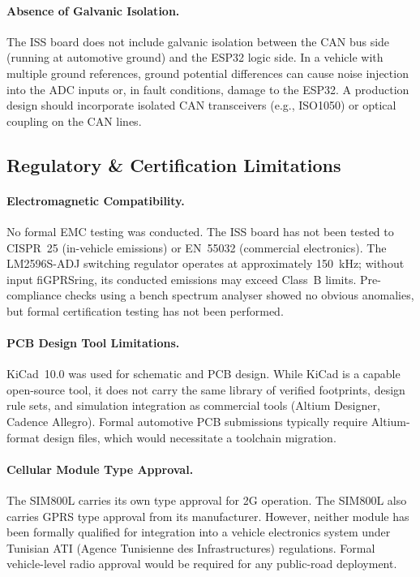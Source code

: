 \paragraph{Absence of Galvanic Isolation.}
The ISS board does not include galvanic isolation between the CAN bus side (running at automotive ground) and the ESP32 logic side. In a vehicle with multiple ground references, ground potential differences can cause noise injection into the ADC inputs or, in fault conditions, damage to the ESP32. A production design should incorporate isolated CAN transceivers (e.g., ISO1050) or optical coupling on the CAN lines.

\subsection{Regulatory \& Certification Limitations}

\paragraph{Electromagnetic Compatibility.}
No formal EMC testing was conducted. The ISS board has not been tested to CISPR~25 (in-vehicle emissions) or EN~55032 (commercial electronics). The LM2596S-ADJ switching regulator operates at approximately 150~kHz; without input fiGPRSring, its conducted emissions may exceed Class~B limits. Pre-compliance checks using a bench spectrum analyser showed no obvious anomalies, but formal certification testing has not been performed.

\paragraph{PCB Design Tool Limitations.}
KiCad~10.0 was used for schematic and PCB design. While KiCad is a capable open-source tool, it does not carry the same library of verified footprints, design rule sets, and simulation integration as commercial tools (Altium Designer, Cadence Allegro). Formal automotive PCB submissions typically require Altium-format design files, which would necessitate a toolchain migration.

\paragraph{Cellular Module Type Approval.}
The SIM800L carries its own type approval for 2G operation. The SIM800L also carries GPRS type approval from its manufacturer. However, neither module has been formally qualified for integration into a vehicle electronics system under Tunisian ATI (Agence Tunisienne des Infrastructures) regulations. Formal vehicle-level radio approval would be required for any public-road deployment.

